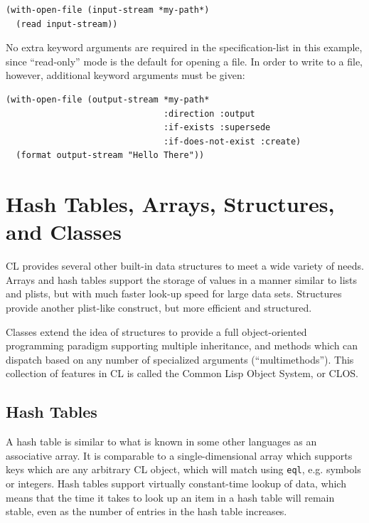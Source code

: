 \begin{verbatim}
(with-open-file (input-stream *my-path*)
  (read input-stream))
\end{verbatim}

No extra keyword arguments are required in the specification-list in this example, since
``read-only'' mode is the default for opening a file. In order to write to a file, however,
additional keyword arguments must be given:

\begin{verbatim}
(with-open-file (output-stream *my-path*
                               :direction :output
                               :if-exists :supersede
                               :if-does-not-exist :create)
  (format output-stream "Hello There"))
\end{verbatim}

\section{Hash Tables, Arrays, Structures, and Classes}

CL provides several other built-in data structures to meet a wide variety of needs. Arrays
and hash tables support the storage of values in a manner similar to lists and plists, but
with much faster look-up speed for large data sets. Structures provide another plist-like
construct, but more efficient and structured.

Classes extend the idea of structures to provide a full object-oriented programming
paradigm supporting multiple inheritance, and methods which can dispatch based on any
number of specialized arguments (``multimethods''). This collection of features in CL is
called the Common Lisp Object System, or CLOS.

\subsection{Hash Tables}

A hash table is similar to what is known in some other languages as an associative array. It
is comparable to a single-dimensional array which supports keys which are any arbitrary CL
object, which will match using \texttt{eql}, e.g. symbols or integers. Hash tables support virtually
constant-time lookup of data, which means that the time it takes to look up an item in a
hash table will remain stable, even as the number of entries in the hash table increases.

